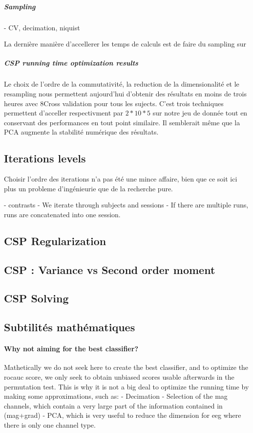 \subparagraph{Sampling}

- CV, decimation, niquist

La dernière manière d'accellerer les temps de calculs est de faire du sampling sur 


\subparagraph{CSP running time optimization results}

Le choix de l'ordre de la commutativité, la reduction de la dimensionalité et le resampling nous permettent aujourd'hui d'obtenir des résultats en moins de trois heures avec 8Cross validation pour tous les sujects. C'est trois techniques permettent d'acceller respectivment par $2*10*5$ sur notre jeu de donnée tout en conservant des performances en tout point similaire. Il semblerait même que la PCA augmente la stabilité numérique des résultats.






\subsection{Iterations levels}

Choisir l'ordre des iterations n'a pas été une mince affaire, bien que ce soit ici plus un probleme d'ingénieurie que de la recherche pure.

- contrasts
- We iterate through subjects and sessions
- If there are multiple runs, runs are concatenated into one session.

\subsection{CSP Regularization}

\subsection{CSP : Variance vs Second order moment}

\subsection{CSP Solving}


\subsection{Subtilités mathématiques}

\paragraph{Why not aiming for the best classifier?}
Mathetically we do not seek here to create the best classifier,
and to optimize the rocauc score, we only seek
to obtain unbiased scores usable afterwards in the permutation test.
This is why it is not a big deal to optimize the running time
by making some approximations, such as:
- Decimation
- Selection of the mag channels, which contain a very large part of
the information contained in (mag+grad)
- PCA, which is very useful to reduce the dimension for eeg
where there is only one channel type.


